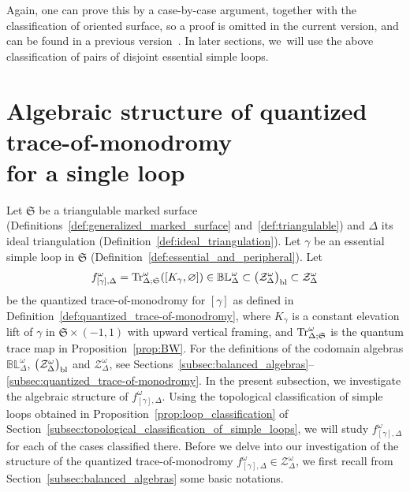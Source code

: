 \documentclass[10pt,a4paper]{amsart}
\numberwithin{equation}{section}
\theoremstyle{definition}
\begin{document}
Again, one can prove this by a case-by-case argument, together with the classification of oriented surface, so a proof is omitted in the current version, and can be found in a previous version~\cite{ver3}.
In later sections, we~will use the above classification of pairs of disjoint essential simple loops.
\section[Algebraic structure of quantized trace-of-monodromy for a single loop]{Algebraic structure of quantized trace-of-monodromy\\ for a single loop}
\label{sec:algebraic_structure_of_quantized_trace-of-monodromy}
Let $\mathfrak{S}$ be a triangulable marked surface (Definitions~\ref{def:generalized_marked_surface} and~\ref{def:triangulable}) and $\Delta$ its ideal triangulation (Definition~\ref{def:ideal_triangulation}).
Let $\gamma$ be an essential simple loop in $\mathfrak{S}$ (Definition~\ref{def:essential_and_peripheral}). Let
\[
f^\omega_{[\gamma],\Delta} = {\rm Tr}^\omega_{\Delta;\mathfrak{S}}([K_\gamma,{\varnothing}]) \in
\mathbb{BL}^\omega_\Delta \subset \bigl(\mathcal{Z}^\omega_\Delta\bigr)_{\rm bl} \subset \mathcal{Z}^\omega_\Delta
\]
be the quantized trace-of-monodromy for $ [\gamma]$ as defined in Definition~\ref{def:quantized_trace-of-monodromy}, where $K_\gamma$ is a constant elevation lift of $\gamma$ in $\mathfrak{S} \times (-1,1)$ with upward vertical framing, and ${\rm Tr}^\omega_{\Delta;\mathfrak{S}}$ is the quantum trace map in Proposition~\ref{prop:BW}. For the definitions of the codomain algebras $\mathbb{BL}^\omega_\Delta$, $\bigl(\mathcal{Z}^\omega_\Delta\bigr)_{\rm bl}$ and $\mathcal{Z}^\omega_\Delta$, see Sections~\ref{subsec:balanced_algebras}--\ref{subsec:quantized_trace-of-monodromy}. In the present subsection, we investigate the algebraic structure of $f^\omega_{[\gamma],\Delta}$. Using the topological classification of simple loops obtained in Proposition~\ref{prop:loop_classification} of Section~\ref{subsec:topological_classification_of_simple_loops}, we will study $f^\omega_{[\gamma],\Delta}$ for each of the cases classified there.
Before we delve into our investigation of the structure of the quantized trace-of-monodromy $f^\omega_{[\gamma],\Delta} \in \mathcal{Z}^\omega_\Delta$, we first recall from Section~\ref{subsec:balanced_algebras} some basic notations.
\end{document}

